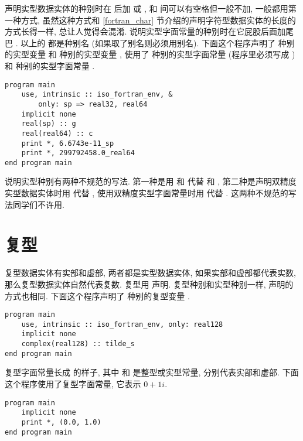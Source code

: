 声明实型数据实体的种别时在  后加 \ttt{([kind])} 或 , 和  间可以有空格但一般不加, 一般都用第一种方式, 虽然这种方式和 \ref{fortran_char} 节介绍的声明字符型数据实体的长度的方式长得一样, 总让人觉得会混淆. 说明实型字面常量的种别时在它屁股后面加尾巴 \ttt{\_{}[kind]}. 以上的 \ttt{[kind]} 都是种别名 (如果取了别名则必须用别名). 下面这个程序声明了  种别的实型变量  和  种别的实型变量 , 使用了  种别的实型字面常量  (程序里必须写成 ) 和  种别的实型字面常量 .
\begin{lstlisting}
program main
    use, intrinsic :: iso_fortran_env, &
        only: sp => real32, real64
    implicit none
    real(sp) :: g
    real(real64) :: c
    print *, 6.6743e-11_sp
    print *, 299792458.0_real64
end program main
\end{lstlisting}

说明实型种别有两种不规范的写法. 第一种是用  和  代替  和 , 第二种是声明双精度实型数据实体时用  代替 , 使用双精度实型字面常量时用  代替 . 这两种不规范的写法同学们不许用.

\section{复型}\label{fortran_complex}

复型数据实体有实部和虚部, 两者都是实型数据实体, 如果实部和虚部都代表实数, 那么复型数据实体自然代表复数. 复型用  声明. 复型种别和实型种别一样, 声明的方式也相同. 下面这个程序声明了  种别的复型变量 .
\begin{lstlisting}
program main
    use, intrinsic :: iso_fortran_env, only: real128
    implicit none
    complex(real128) :: tilde_s
end program main
\end{lstlisting}

复型字面常量长成 \ttt{([real], [imag])}的样子, 其中 \ttt{[real]} 和 \ttt{[imag]}是整型或实型常量, 分别代表实部和虚部. 下面这个程序使用了复型字面常量, 它表示 $0+1i$.
\begin{lstlisting}
program main
    implicit none
    print *, (0.0, 1.0)
end program main
\end{lstlisting}

